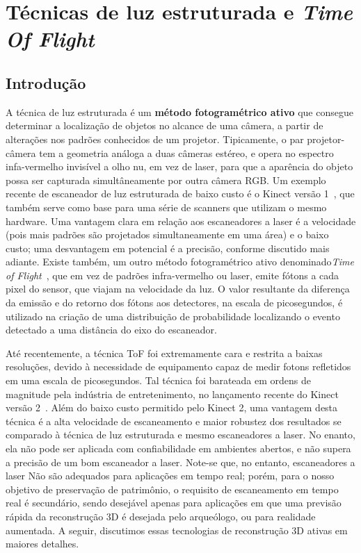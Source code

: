\chapter{Técnicas de luz estruturada e \emph{Time Of Flight}}\label{cap:kinect}

\section{Introdução}

A técnica de luz estruturada é um
\textbf{método fotogramétrico ativo} que consegue determinar a localização de
objetos no alcance de uma câmera, a partir de alterações nos padrões conhecidos
de um projetor.  Tipicamente, o par projetor-câmera tem a geometria análoga a
duas câmeras estéreo, e opera no espectro infa-vermelho invisível a olho nu, em
vez de laser, para que a aparência do objeto possa ser capturada
simultâneamente por outra câmera RGB.  Um exemplo recente de escaneador de luz
estruturada de baixo custo é o Kinect versão 1~\cite{smisek20133d}, que também
serve como base para uma série de scanners que utilizam o mesmo hardware. Uma
vantagem clara em relação aos escaneadores a laser é a velocidade (pois mais padrões são projetados simultaneamente em uma área) e o
baixo custo; uma desvantagem em potencial é a precisão, conforme discutido mais adiante.
Existe também, um outro método fotogramétrico ativo denominado\emph{Time of
Flight}~\cite{gokturk2004time}, que em vez de padrões infra-vermelho ou laser,
emite fótons a cada pixel do sensor, que viajam na velocidade da luz. O valor resultante
da diferença da emissão e do retorno dos fótons aos detectores, na escala de picosegundos, é utilizado na
criação de uma distribuição de probabilidade localizando o evento detectado a
uma distância do eixo do escaneador.

Até recentemente, a técnica ToF foi extremamente cara e restrita a baixas resoluções, devido à
necessidade de equipamento capaz de medir fotons refletidos em uma escala de
picosegundos. Tal técnica foi barateada em ordens de magnitude pela indústria
de entretenimento, no lançamento recente do Kinect versão
2~\cite{lachat2015first,valgma20163d}. Além do baixo custo permitido pelo
Kinect 2, uma vantagem desta técnica é a alta velocidade de escaneamento e
maior robustez dos resultados se comparado à técnica de luz estruturada e mesmo escaneadores a laser.
No enanto, ela não pode ser aplicada com confiabilidade em ambientes abertos,
e não supera a precisão de um bom escaneador a laser. Note-se que, no entanto, escaneadores a laser Não são adequados para aplicações em tempo real; porém, para o nosso objetivo de preservação de patrimônio,
o requisito de escaneamento em tempo real é secundário, sendo desejável apenas para aplicações em que uma previsão rápida da reconstrução 3D é desejada pelo arqueólogo, ou para realidade aumentada.
A seguir, discutimos essas tecnologias de reconstrução 3D ativas em maiores detalhes.

